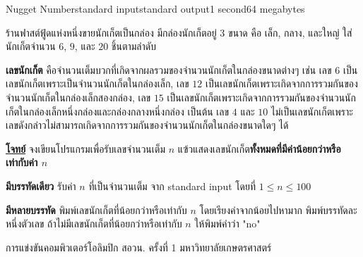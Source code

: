\documentclass[11pt,a4paper]{article}
\begin{document}
\begin{problem}{Nugget Number}{standard input}{standard output}{1 second}{64 megabytes}

ร้านฟาสต์ฟู้ดแห่งหนึ่งขายนักเก็ตเป็นกล่อง มีกล่องนักเก็ตอยู่ $3$ ขนาด คือ เล็ก, กลาง, และใหญ่ ใส่นักเก็ตจำนวน $6$, $9$, และ $20$ ชิ้นตามลำดับ

\textbf{เลขนักเก็ต} คือจำนวนเต็มบวกที่เกิดจากผลรวมของจำนวนนักเก็ตในกล่องขนาดต่างๆ เช่น เลข $6$ เป็นเลขนักเก็ตเพราะเป็นจำนวนนักเก็ตในกล่องเล็ก, เลข $12$ เป็นเลขนักเก็ตเพราะเกิดจากการรวมกันของจำนวนนักเก็ตในกล่องเล็กสองกล่อง, เลข $15$ เป็นเลขนักเก็ตเพราะเกิดจากการรวมกันของจำนวนนักเก็ตในกล่องเล็กหนึ่งกล่องและกล่องกลางหนึ่งกล่อง เป็นต้น เลข $4$ และ $10$ ไม่เป็นเลขนักเก็ตเพราะเลขดังกล่าวไม่สามารถเกิดจากการรวมกันของจำนวนนักเก็ตในกล่องขนาดใดๆ ได้


\underline{\textbf{โจทย์}} จงเขียนโปรแกรมเพื่อรับเลขจำนวนเต็ม $n$ แฃ้วแสดงเลขนักเก็ต\textbf{ทั้งหมดที่มีค่าน้อยกว่าหรือเท่ากับค่า $n$}


\InputFile
\textbf{มีบรรทัดเดียว} รับค่า $n$ ที่เป็นจำนวนเต็ม จาก standard input โดยที่ $1 \leq n \leq 100$

\OutputFile

\textbf{มีหลายบรรทัด} พิมพ์เลขนักเก็ตที่น้อยกว่าหรือเท่ากับ $n$ โดยเรียงค่าจากน้อยไปหามาก พิมพ์บรรทัดละหนึ่งตัวเลข ถ้าไม่มีเลขนักเก็ตที่น้อยกว่าหรือเท่ากับ $n$ ให้พิมพ์คำว่า "no"

\Examples

\begin{example}
%
%
\end{example}

\Source

การแข่งขันคอมพิวเตอร์โอลิมปิก สอวน. ครั้งที่ 1 มหาวิทยาลัยเกษตรศาสตร์

\end{problem}
\end{document}
